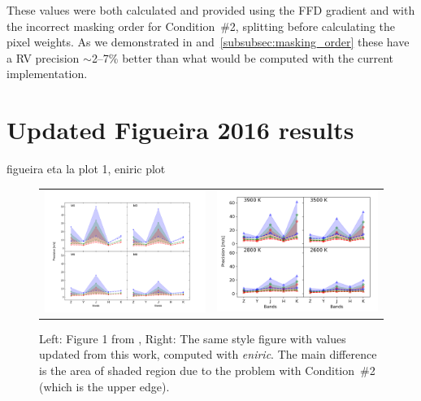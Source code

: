 These values were both calculated and provided using the {FFD} gradient and with the incorrect masking order for Condition~\#2, splitting before calculating the pixel weights. As we demonstrated in  and~\ref{subsubsec:masking_order} these have a {RV} precision \(\sim\)2--7\% better than what would be computed with the current implementation.


\section{ Updated Figueira 2016 results}
 figueira eta la plot 1, eniric plot

\begin{figure}
    \centering
    \begin{tabular}{cc}
         
    \includegraphics[width=0.48\linewidth]{figures/information-content/Rvprec_vsini1.pdf} &  %
    \includegraphics[width=0.47\linewidth]{figures/information-content/precision_fourpanel.png}\\ %
    \end{tabular}
    \caption{Left: Figure 1 from \citet{figueira_radial_2016}, Right: The same style figure with values updated from this work, computed with \emph{eniric}. The main difference is the area of shaded region due to the problem with Condition~\#2 (which is the upper edge).}
    \label{fig:my_label}
\end{figure}


